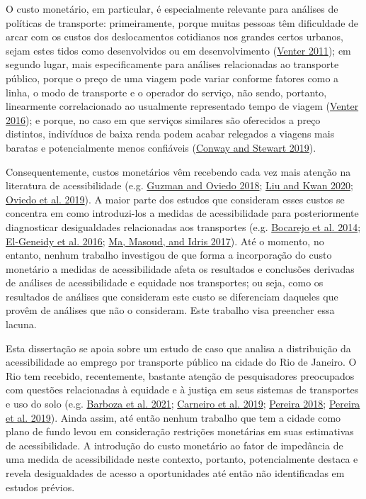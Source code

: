 \documentclass[msc,numbers]{coppe}
\begin{document}
  O custo monetário, em particular, é especialmente relevante para análises de políticas de transporte: primeiramente, porque muitas pessoas têm dificuldade de arcar com os custos dos deslocamentos cotidianos nos grandes certos urbanos, sejam estes tidos como desenvolvidos ou em desenvolvimento (\protect\hyperlink{ref-venter2011transport}{Venter 2011}); em segundo lugar, mais especificamente para análises relacionadas ao transporte público, porque o preço de uma viagem pode variar conforme fatores como a linha, o modo de transporte e o operador do serviço, não sendo, portanto, linearmente correlacionado ao usualmente representado tempo de viagem (\protect\hyperlink{ref-venter2016assessing}{Venter 2016}); e porque, no caso em que serviços similares são oferecidos a preço distintos, indivíduos de baixa renda podem acabar relegados a viagens mais baratas e potencialmente menos confiáveis (\protect\hyperlink{ref-conway2019getting}{Conway and Stewart 2019}).

  Consequentemente, custos monetários vêm recebendo cada vez mais atenção na literatura de acessibilidade (e.g. \protect\hyperlink{ref-guzman2018accessibility}{Guzman and Oviedo 2018}; \protect\hyperlink{ref-liu2020measuring}{Liu and Kwan 2020}; \protect\hyperlink{ref-oviedo2019bus}{Oviedo et al. 2019}). A maior parte dos estudos que consideram esses custos se concentra em como introduzi-los a medidas de acessibilidade para posteriormente diagnosticar desigualdades relacionadas aos transportes (e.g. \protect\hyperlink{ref-bocarejo2014innovative}{Bocarejo et al. 2014}; \protect\hyperlink{ref-el-geneidy2016cost}{El-Geneidy et al. 2016}; \protect\hyperlink{ref-ma2017modeling}{Ma, Masoud, and Idris 2017}). Até o momento, no entanto, nenhum trabalho investigou de que forma a incorporação do custo monetário a medidas de acessibilidade afeta os resultados e conclusões derivadas de análises de acessibilidade e equidade nos transportes; ou seja, como os resultados de análises que consideram este custo se diferenciam daqueles que provêm de análises que não o consideram. Este trabalho visa preencher essa lacuna.

  Esta dissertação se apoia sobre um estudo de caso que analisa a distribuição da acessibilidade ao emprego por transporte público na cidade do Rio de Janeiro. O Rio tem recebido, recentemente, bastante atenção de pesquisadores preocupados com questões relacionadas à equidade e à justiça em seus sistemas de transportes e uso do solo (e.g. \protect\hyperlink{ref-barboza2021balancing}{Barboza et al. 2021}; \protect\hyperlink{ref-carneiro2019espraiamento}{Carneiro et al. 2019}; \protect\hyperlink{ref-pereira2018transport}{Pereira 2018}; \protect\hyperlink{ref-pereira2019distributional}{Pereira et al. 2019}). Ainda assim, até então nenhum trabalho que tem a cidade como plano de fundo levou em consideração restrições monetárias em suas estimativas de acessibilidade. A introdução do custo monetário ao fator de impedância de uma medida de acessibilidade neste contexto, portanto, potencialmente destaca e revela desigualdades de acesso a oportunidades até então não identificadas em estudos prévios.
\end{document}
